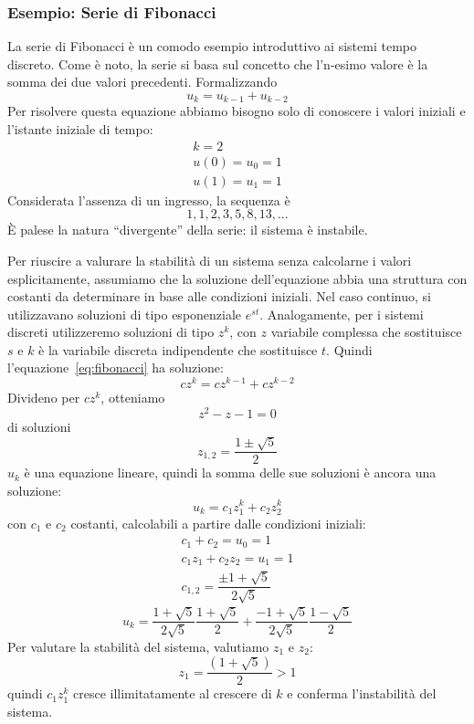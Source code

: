 \documentclass[a4paper]{report}
\begin{document}
\subsubsection{Esempio: Serie di Fibonacci}
La serie di Fibonacci \`e un comodo esempio introduttivo ai sistemi
tempo discreto. Come \`e noto, la serie si basa sul concetto che
l'n-esimo valore \`e la somma dei due valori precedenti. Formalizzando
\begin{equation}\label{eq:fibonacci}
u_k = u_{k-1} + u_{k-2}
\end{equation}
Per risolvere questa equazione abbiamo bisogno solo di conoscere i
valori iniziali e l'istante iniziale di tempo:
\[
\begin{array}{l}
  k = 2\\
  u(0) = u_0 = 1\\
  u(1) = u_1 = 1
\end{array}
\]
Considerata l'assenza di un ingresso, la sequenza \`e
\[
1,1,2,3,5,8,13,...
\]
\`E palese la natura ``divergente'' della serie: il sistema \`e
instabile.

Per riuscire a valurare la stabilit\`a di un sistema senza calcolarne
i valori esplicitamente, assumiamo che la soluzione dell'equazione
abbia una struttura con costanti da determinare in base alle
condizioni iniziali. Nel caso continuo, si utilizzavano soluzioni di
tipo esponenziale $e^{st}$. Analogamente, per i sistemi discreti
utilizzeremo soluzioni di tipo $z^k$, con $z$ variabile complessa che
sostituisce $s$ e $k$ \`e la variabile discreta indipendente che
sostituisce $t$. Quindi l'equazione~\ref{eq:fibonacci} ha soluzione:
\begin{equation}\label{eq:fibonacci02}
  cz^k = cz^{k-1} + cz^{k-2}
\end{equation}
Divideno per $cz^k$, otteniamo
\[
z^2 - z -1 = 0
\]
di soluzioni
\[
z_{1,2} = \dfrac{1 \pm \sqrt{5}}{2}
\]
$u_k$ \`e una equazione lineare, quindi la somma delle sue soluzioni
\`e ancora una soluzione:
\[
u_k = c_1 z_1^k + c_2z_2^k
\]
con $c_1$ e $c_2$ costanti, calcolabili a partire dalle condizioni
iniziali:
\[
\begin{array}{l}
  c_1 + c_2 = u_0 = 1\\
  c_1z_1 + c_2z_2 = u_1 = 1\\
  c_{1,2} = \dfrac{\pm 1 + \sqrt{5}}{2 \sqrt{5}}
\end{array}
\]
\[
u_k = \dfrac{1 + \sqrt{5}}{2 \sqrt{5}}\dfrac{1 + \sqrt{5}}{2} +
\dfrac{-1 + \sqrt{5}}{2 \sqrt{5}}\dfrac{1 - \sqrt{5}}{2} 
\]
Per valutare la stabilit\`a del sistema, valutiamo $z_1$ e $z_2$:
\[
z_1 = \dfrac{(1 + \sqrt{5})}{2} > 1
\]
quindi $c_1z_1^k$ cresce illimitatamente al crescere di $k$ e conferma
l'instabilit\`a del sistema.
\end{document}
